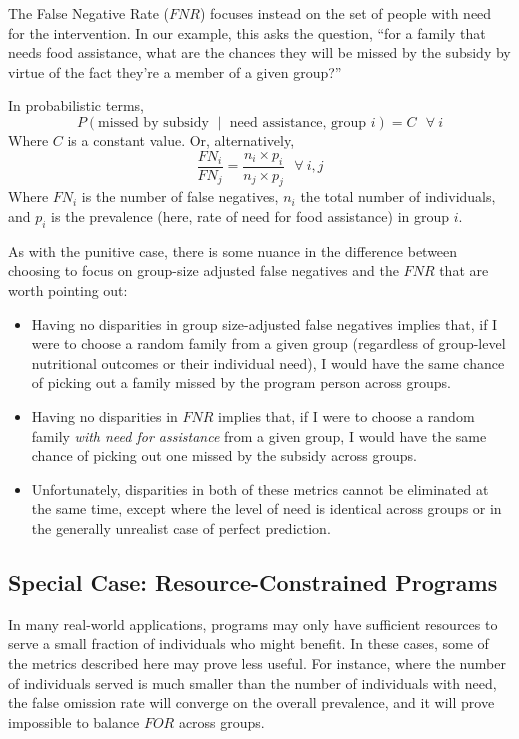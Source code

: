 \documentclass[]{krantz}
\begin{document}
The False Negative Rate (\(FNR\)) focuses instead on the set of people
with need for the intervention. In our example, this asks the question,
``for a family that needs food assistance, what are the chances they
will be missed by the subsidy by virtue of the fact they're a member of
a given group?''

In probabilistic terms,
\[P(\textrm{missed by subsidy $\mid$ need assistance, group $i$}) = C~~~\forall~i\]
Where \(C\) is a constant value. Or, alternatively,
\[\frac{FN_i}{FN_j} = \frac{n_i \times p_i}{n_j \times p_j}~~~\forall~i,j\]
Where \(FN_i\) is the number of false negatives, \(n_i\) the total
number of individuals, and \(p_i\) is the prevalence (here, rate of need
for food assistance) in group \(i\).

As with the punitive case, there is some nuance in the difference
between choosing to focus on group-size adjusted false negatives and the
\(FNR\) that are worth pointing out:

\begin{itemize}
\item
  Having no disparities in group size-adjusted false negatives implies
  that, if I were to choose a random family from a given group
  (regardless of group-level nutritional outcomes or their individual
  need), I would have the same chance of picking out a family missed by
  the program person across groups.
\item
  Having no disparities in \(FNR\) implies that, if I were to choose a
  random family \emph{with need for assistance} from a given group, I
  would have the same chance of picking out one missed by the subsidy
  across groups.
\item
  Unfortunately, disparities in both of these metrics cannot be
  eliminated at the same time, except where the level of need is
  identical across groups or in the generally unrealist case of perfect
  prediction.
\end{itemize}

\hypertarget{sec:constrainedassistive}{\subsection{Special Case:
Resource-Constrained Programs}\label{sec:constrainedassistive}}

In many real-world applications, programs may only have sufficient
resources to serve a small fraction of individuals who might benefit. In
these cases, some of the metrics described here may prove less useful.
For instance, where the number of individuals served is much smaller
than the number of individuals with need, the false omission rate will
converge on the overall prevalence, and it will prove impossible to
balance \(FOR\) across groups.
\end{document}
